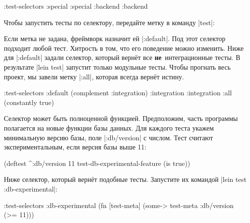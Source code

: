 \begin{english}
  \begin{clojure}
:test-selectors {:special :special
                 :backend :backend}
  \end{clojure}
\end{english}

\noindent
Чтобы запустить тесты по селектору, передайте метку в команду \spverb|test|:

\begin{english}
\end{english}


Если метка не задана, фреймворк назначит ей \spverb|:default|. Под этот селектор
подходит любой тест. Хитрость в том, что его поведение можно изменить. Ниже для
\spverb|:default| задали селектор, который вернёт все \textbf{не}~интеграционные
тесты. В результате \spverb|lein test| запустит только модульные тесты. Чтобы
прогнать весь проект, мы завели метку \spverb|:all|, которая всегда вернёт
истину.

\begin{english}
  \begin{clojure}
:test-selectors {:default (complement :integration)
                 :integration :integration
                 :all (constantly true)}
  \end{clojure}
\end{english}

Селектор может быть полноценной функцией. Предположим, часть программы
полагается на новые функции базы данных. Для каждого теста укажем минимальную
версию базы, поле \spverb|:db/version| с числом. Тест считают экспериментальным,
если версия базы выше 11:

\begin{english}
  \begin{clojure}
(deftest ^{:db/version 11}
  test-db-experimental-feature
  (is true))
  \end{clojure}
\end{english}

\noindent
Ниже селектор, который вернёт подобные тесты. Запустите их командой
\spverb|lein test :db-experimental|:

\begin{english}
  \begin{clojure}
:test-selectors
{:db-experimental
 (fn [test-meta]
   (some-> test-meta :db/version (>= 11)))}
  \end{clojure}
\end{english}

